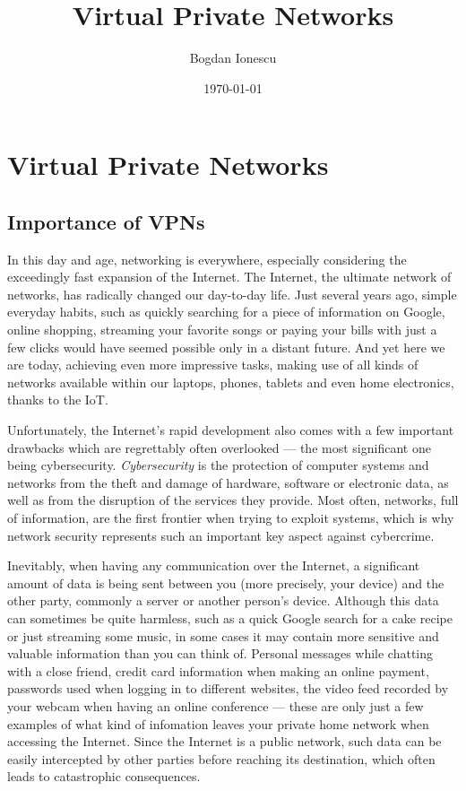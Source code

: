 \documentclass[a4paper,12pt]{report}
\begin{document}
	\title{Virtual Private Networks}
	\author{Bogdan Ionescu}
	\date{\today}
	\maketitle
	\tableofcontents
	
	\glsaddall
	\printglossary[type=\acronymtype,nonumberlist,style=long]
	
	\chapter{Virtual Private Networks}
	\section{Importance of VPNs}
		In this day and age, networking is everywhere, especially considering the exceedingly fast expansion of the Internet. The Internet, the ultimate network of networks, has radically changed our day-to-day life. Just several years ago, simple everyday habits, such as quickly searching for a piece of information on Google, online shopping, streaming your favorite songs or paying your bills with just a few clicks would have seemed possible only in a distant future. And yet here we are today, achieving even more impressive tasks, making use of all kinds of networks available within our laptops, phones, tablets and even home electronics, thanks to the IoT.
		
		Unfortunately, the Internet's rapid development also comes with a few important drawbacks which are regrettably often overlooked --- the most significant one being cybersecurity. \textit{Cybersecurity} is the protection of computer systems and networks from the theft and damage of hardware, software or electronic data, as well as from the disruption of the services they provide. Most often, networks, full of information, are the first frontier when trying to exploit systems,  which is why network security represents such an important key aspect against cybercrime.
		
		Inevitably, when having any communication over the Internet, a significant amount of data is being sent between you (more precisely, your device) and the other party, commonly a server or another person's device. Although this data can sometimes be quite harmless, such as a quick Google search for a cake recipe or just streaming some music, in some cases it may contain more sensitive and valuable information than you can think of. Personal messages while chatting with a close friend, credit card information when making an online payment, passwords used when logging in to different websites, the video feed recorded by your webcam when having an online conference --- these are only just a few examples of what kind of infomation leaves your private home network when accessing the Internet. Since the Internet is a public network, such data can be easily intercepted by other parties before reaching its destination, which often leads to catastrophic consequences.
		
\end{document}
